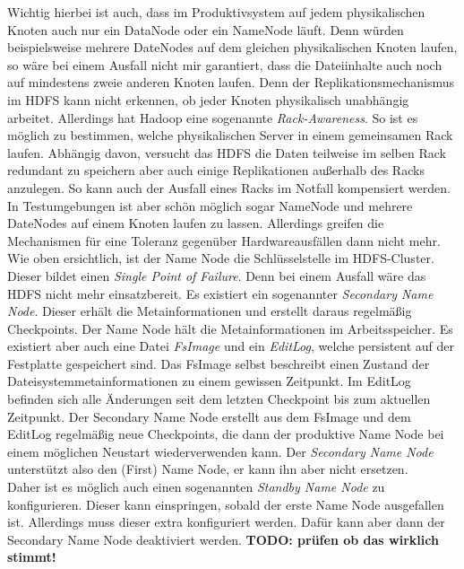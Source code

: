 \noindent
Wichtig hierbei ist auch, dass im Produktivsystem auf jedem physikalischen Knoten auch nur ein DataNode oder ein NameNode läuft. Denn würden beispielsweise mehrere DateNodes auf dem gleichen physikalischen Knoten laufen, so wäre bei einem Ausfall nicht mir garantiert, dass die Dateiinhalte auch noch auf mindestens zweie anderen Knoten laufen. Denn der Replikationsmechanismus im HDFS kann nicht erkennen, ob jeder Knoten physikalisch unabhängig arbeitet. Allerdings hat Hadoop eine sogenannte \textit{Rack-Awareness}. So ist es möglich zu bestimmen, welche physikalischen Server in einem gemeinsamen Rack laufen. Abhängig davon, versucht das HDFS die Daten teilweise im selben Rack redundant zu speichern aber auch einige Replikationen außerhalb des Racks anzulegen. So kann auch der Ausfall eines Racks im Notfall kompensiert werden.\\
In Testumgebungen ist aber schön möglich sogar NameNode und mehrere DateNodes auf einem Knoten laufen zu lassen. Allerdings greifen die Mechanismen für eine Toleranz gegenüber Hardwareausfällen dann nicht mehr.\\

\noindent
Wie oben ersichtlich, ist der Name Node die Schlüsselstelle im HDFS-Cluster. Dieser bildet einen \textit{Single Point of Failure}. Denn bei einem Ausfall wäre das HDFS nicht mehr einsatzbereit. Es existiert ein sogenannter \textit{Secondary Name Node}. Dieser erhält die Metainformationen und erstellt daraus regelmäßig Checkpoints. Der Name Node hält die Metainformationen im Arbeitsspeicher. Es existiert aber auch eine Datei \textit{FsImage} und ein \textit{EditLog}, welche persistent auf der Festplatte gespeichert sind. Das FsImage selbst beschreibt einen Zustand der Dateisystemmetainformationen zu einem gewissen Zeitpunkt. Im EditLog befinden sich alle Änderungen seit dem letzten Checkpoint bis zum aktuellen Zeitpunkt. Der Secondary Name Node erstellt aus dem FsImage und dem EditLog regelmäßig neue Checkpoints, die dann der produktive Name Node bei einem möglichen Neustart wiederverwenden kann. Der \textit{Secondary Name Node} unterstützt also den (First) Name Node, er kann ihn aber nicht ersetzen.\\
Daher ist es möglich auch einen sogenannten \textit{Standby Name Node} zu konfigurieren. Dieser kann einspringen, sobald der erste Name Node ausgefallen ist. Allerdings muss dieser extra konfiguriert werden. Dafür kann aber dann der Secondary Name Node deaktiviert werden.\cite[S. 88]{expert_hadoop_admin}\textbf{ TODO: prüfen ob das wirklich stimmt!}\\

